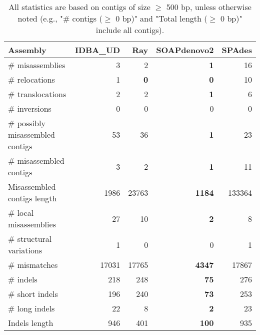 \documentclass[12pt,a4paper]{article}
\begin{document}
\begin{table}[ht]
\begin{center}
\caption{All statistics are based on contigs of size $\geq$ 500 bp, unless otherwise noted (e.g., "\# contigs ($\geq$ 0 bp)" and "Total length ($\geq$ 0 bp)" include all contigs).}
\begin{tabular}{|l*{4}{|r}|}
\hline
Assembly & IDBA\_UD & Ray & SOAPdenovo2 & SPAdes \\ \hline
\# misassemblies & 3 & 2 & {\bf 1} & 16 \\ \hline
\hspace{5mm}\# relocations & 1 & {\bf 0} & {\bf 0} & 10 \\ \hline
\hspace{5mm}\# translocations & 2 & 2 & {\bf 1} & 6 \\ \hline
\hspace{5mm}\# inversions & 0 & 0 & 0 & 0 \\ \hline
\# possibly misassembled contigs & 53 & 36 & {\bf 1} & 23 \\ \hline
\# misassembled contigs & 3 & 2 & {\bf 1} & 11 \\ \hline
Misassembled contigs length & 1986 & 23763 & {\bf 1184} & 133364 \\ \hline
\# local misassemblies & 27 & 10 & {\bf 2} & 8 \\ \hline
\# structural variations & 1 & 0 & 0 & 1 \\ \hline
\# mismatches & 17031 & 17765 & {\bf 4347} & 17867 \\ \hline
\# indels & 218 & 248 & {\bf 75} & 276 \\ \hline
\hspace{5mm}\# short indels & 196 & 240 & {\bf 73} & 253 \\ \hline
\hspace{5mm}\# long indels & 22 & 8 & {\bf 2} & 23 \\ \hline
Indels length & 946 & 401 & {\bf 100} & 935 \\ \hline
\end{tabular}
\end{center}
\end{table}
\end{document}
